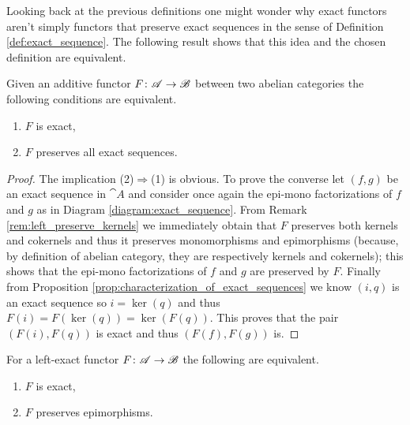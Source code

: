 Looking back at the previous definitions one might wonder why exact functors aren't simply functors that preserve exact sequences in the sense of Definition \ref{def:exact_sequence}. The following result shows that this idea and the chosen definition are equivalent.

\begin{proposition}
  \label{prop:exact_functor_preserves_exact_sequences}
  Given an additive functor \(F\colon {\mathscr A}\to {\mathscr B}\) between two abelian categories the following conditions are equivalent.
  \begin{enumerate}[label=(\arabic*)]
  \item \(F\) is exact,
  \item \(F\) preserves all exact sequences.
  \end{enumerate}
\end{proposition}

\begin{proof}
  The implication (2)\(\Rightarrow\)(1) is obvious. To prove the converse let \((f, g)\) be an exact sequence in \(\cat{A}\) and consider once again the epi-mono factorizations of \(f\) and \(g\) as in Diagram \ref{diagram:exact_sequence}. From Remark \ref{rem:left_preserve_kernels} we immediately obtain that \(F\) preserves both kernels and cokernels and thus it preserves monomorphisms and epimorphisms (because, by definition of abelian category, they are respectively kernels and cokernels); this shows that the epi-mono factorizations of \(f\) and \(g\) are preserved by \(F\). Finally from Proposition \ref{prop:characterization_of_exact_sequences} we know \((i, q)\) is an exact sequence so \(i = \ker(q)\) and thus \(F(i) = F(\ker(q)) = \ker(F(q))\). This proves that the pair \((F(i), F(q))\) is exact and thus \((F(f), F(g))\) is.
\end{proof}

\begin{proposition}
  \label{prop:left_condition}
  For a left-exact functor \(F\colon {\mathscr A}\to {\mathscr B}\) the following are equivalent.
  \begin{enumerate}[label=(\arabic*)]
  \item \(F\) is exact,
  \item \(F\) preserves epimorphisms.
  \end{enumerate}
\end{proposition}

